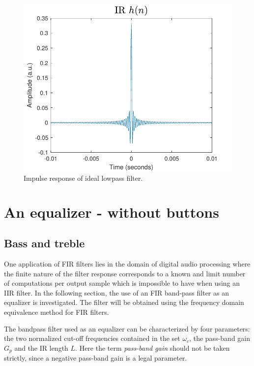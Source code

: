 \documentclass[journal]{IEEEtran}
\begin{document}
\begin{figure}
    \centering
    \includegraphics[width=\columnwidth,clip]{assignment_02/plots/impulse_resp_lowpass_fir.pdf}
    \caption{Impulse response of ideal lowpass filter.}
    \label{fig:imp_resp_lowpass}
\end{figure}


\newpage

\section{An equalizer - without buttons}
\subsection{Bass and treble}

One application of FIR filters lies in the domain of digital audio processing where the finite nature of the filter response corresponds to a known and limit number of computations per output sample which is impossible to have when using an IIR filter. In the following section, the use of an FIR band-pass filter as an equalizer is investigated. The filter will be obtained using the frequency domain equivalence method for FIR filters.

The bandpass filter used as an equalizer can be characterized by four parameters: the two normalized cut-off frequencies contained in the set $\omega_c$, the pass-band gain $G_p$ and the IR length $L$. Here the term \textit{pass-band gain} should not be taken strictly, since a negative pass-band gain is a legal parameter.
\end{document}
